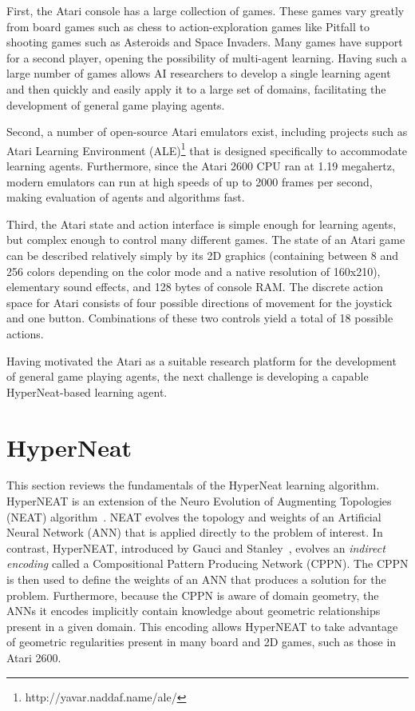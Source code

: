 \documentclass{acm_proc_article-sp}
\begin{document}
First, the Atari console has a large collection of games. These games vary greatly from board games such as chess to action-exploration games like Pitfall to shooting games such as Asteroids and Space Invaders. Many games have support for a second player, opening the possibility of multi-agent learning. Having such a large number of games allows AI researchers to develop a single learning agent and then quickly and easily apply it to a large set of domains, facilitating the development of general game playing agents.

Second, a number of open-source Atari emulators exist, including projects such as Atari Learning Environment (ALE)\footnote{http://yavar.naddaf.name/ale/} that is designed specifically to accommodate learning agents. Furthermore, since the Atari 2600 CPU ran at 1.19 megahertz, modern emulators can run at high speeds of up to 2000 frames per second, making evaluation of agents and algorithms fast.

Third, the Atari state and action interface is simple enough for learning agents, but complex enough to control many different games. The state of an Atari game can be described relatively simply by its 2D graphics (containing between 8 and 256 colors depending on the color mode and a native resolution of 160x210), elementary sound effects, and 128 bytes of console RAM. The discrete action space for Atari consists of four possible directions of movement for the joystick and one button. Combinations of these two controls yield a total of 18 possible actions.

Having motivated the Atari as a suitable research platform for the development of general game playing agents, the next challenge is developing a capable HyperNeat-based learning agent.

\section{HyperNeat}
\label{sec:hyperneat}
This section reviews the fundamentals of the HyperNeat learning algorithm. HyperNEAT is an extension of the Neuro Evolution of Augmenting Topologies (NEAT) algorithm~\cite{stanley02}. NEAT evolves the topology and weights of an Artificial Neural Network (ANN) that is applied directly to the problem of interest. In contrast, HyperNEAT, introduced by Gauci and Stanley~\cite{gauci08}, evolves an \emph{indirect encoding} called a Compositional Pattern Producing Network (CPPN). The CPPN is then used to define the weights of an ANN that produces a solution for the problem. Furthermore, because the CPPN is aware of domain geometry, the ANNs it encodes implicitly contain knowledge about geometric relationships present in a given domain. This encoding allows HyperNEAT to take advantage of geometric regularities present in many board and 2D games, such as those in Atari 2600.
\end{document}
